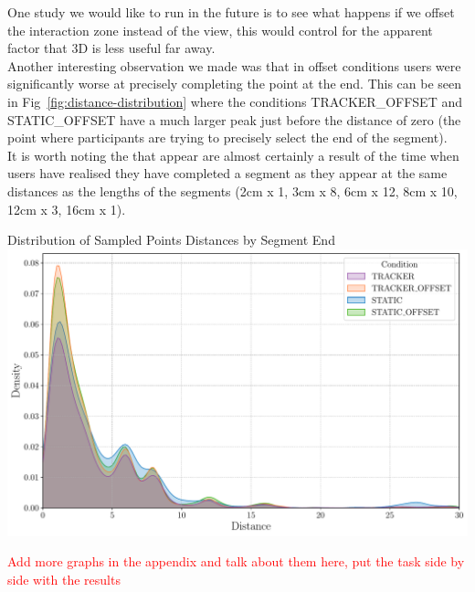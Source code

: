 One study we would like to run in the future is to see what happens if we offset the interaction zone instead of the view, this would control for the apparent factor that 3D is less useful far away. \\

Another interesting observation we made was that in offset conditions users were significantly worse at precisely completing the point at the end. This can be seen in Fig~\ref{fig:distance-distribution} where the conditions TRACKER\_OFFSET and STATIC\_OFFSET have a much larger peak just before the distance of zero (the point where participants are trying to precisely select the end of the segment). \\

It is worth noting the that appear are almost certainly a result of the time when users have realised they have completed a segment as they appear at the same distances as the lengths of the segments (2cm x 1, 3cm x 8, 6cm x 12, 8cm x 10, 12cm x 3, 16cm x 1).

\begin{figureBox}[label={fig:distance-distribution}, width=1.0\linewidth]{Distribution of Sampled Points Distances by Segment End}
    \includegraphics[width = 1.0\linewidth]{./evaluation/figures/survery/distance-distribution.pdf}
\end{figureBox}

\textcolor{red}{Add more graphs in the appendix and talk about them here, put the task side by side with the results}
